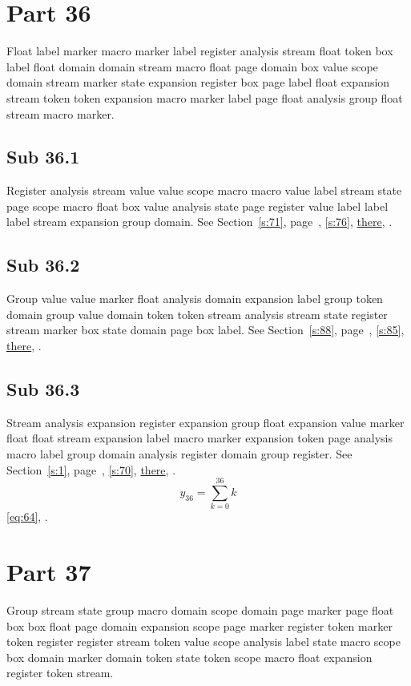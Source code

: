 \documentclass[11pt]{article}
\begin{document}
\section{Part 36}\label{s:36}
Float label marker macro marker label register analysis stream float token box label float domain domain stream macro float page domain box value scope domain stream marker state expansion register box page label float expansion stream token token expansion macro marker label page float analysis group float stream macro marker.
\subsection{Sub 36.1}\label{ss:36.1} Register analysis stream value value scope macro macro value label stream state page scope macro float box value analysis state page register value label label label stream expansion group domain. See Section~\ref{s:71}, page~\pageref{ss:48.2}, \cref{s:76}, \hyperref[s:33]{there}, \cite{k100,k97}.
\subsection{Sub 36.2}\label{ss:36.2} Group value value marker float analysis domain expansion label group token domain group value domain token token stream analysis stream state register stream marker box state domain page box label. See Section~\ref{s:88}, page~\pageref{ss:48.3}, \cref{s:85}, \hyperref[s:16]{there}, \cite{k26,k32}.
\subsection{Sub 36.3}\label{ss:36.3} Stream analysis expansion register expansion group float expansion value marker float float stream expansion label macro marker expansion token page analysis macro label group domain analysis register domain group register. See Section~\ref{s:1}, page~\pageref{ss:14.2}, \cref{s:70}, \hyperref[s:66]{there}, \cite{k39,k97}.
\begin{equation}y_{36}=\sum_{k=0}^{36}k\label{eq:36}\end{equation} \eqref{eq:64}, .
\section{Part 37}\label{s:37}
Group stream state group macro domain scope domain page marker page float box box float page domain expansion scope page marker register token marker token register register stream token value scope analysis label state macro scope box domain marker domain token state token scope macro float expansion register token stream.
\end{document}
